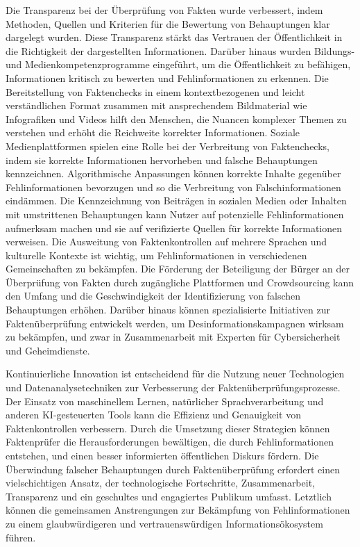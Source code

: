 \documentclass[a4paper,listof=totoc,bibliography=totoc]{scrartcl}
\begin{document}
Die Transparenz bei der Überprüfung von Fakten wurde verbessert, indem Methoden, Quellen und Kriterien für die Bewertung von Behauptungen klar dargelegt wurden. Diese 
Transparenz stärkt das Vertrauen der Öffentlichkeit in die Richtigkeit der dargestellten Informationen. Darüber hinaus wurden Bildungs- und Medienkompetenzprogramme eingeführt, 
um die Öffentlichkeit zu befähigen, Informationen kritisch zu bewerten und Fehlinformationen zu erkennen. Die Bereitstellung von Faktenchecks in einem kontextbezogenen 
und leicht verständlichen Format zusammen mit ansprechendem Bildmaterial wie Infografiken und Videos hilft den Menschen, die Nuancen komplexer Themen zu verstehen und 
erhöht die Reichweite korrekter Informationen. Soziale Medienplattformen spielen eine Rolle bei der Verbreitung von Faktenchecks, indem sie korrekte Informationen 
hervorheben und falsche Behauptungen kennzeichnen. Algorithmische Anpassungen können korrekte Inhalte gegenüber Fehlinformationen bevorzugen und so die Verbreitung von 
Falschinformationen eindämmen. Die Kennzeichnung von Beiträgen in sozialen Medien oder Inhalten mit umstrittenen Behauptungen kann Nutzer auf potenzielle Fehlinformationen 
aufmerksam machen und sie auf verifizierte Quellen für korrekte Informationen verweisen. Die Ausweitung von Faktenkontrollen auf mehrere Sprachen und kulturelle Kontexte 
ist wichtig, um Fehlinformationen in verschiedenen Gemeinschaften zu bekämpfen. Die Förderung der Beteiligung der Bürger an der Überprüfung von Fakten durch zugängliche 
Plattformen und Crowdsourcing kann den Umfang und die Geschwindigkeit der Identifizierung von falschen Behauptungen erhöhen. Darüber hinaus können spezialisierte Initiativen 
zur Faktenüberprüfung entwickelt werden, um Desinformationskampagnen wirksam zu bekämpfen, und zwar in Zusammenarbeit mit Experten für Cybersicherheit und Geheimdienste.\newline

Kontinuierliche Innovation ist entscheidend für die Nutzung neuer Technologien und Datenanalysetechniken zur Verbesserung der Faktenüberprüfungsprozesse. Der Einsatz von 
maschinellem Lernen, natürlicher Sprachverarbeitung und anderen KI-gesteuerten Tools kann die Effizienz und Genauigkeit von Faktenkontrollen verbessern. Durch die Umsetzung 
dieser Strategien können Faktenprüfer die Herausforderungen bewältigen, die durch Fehlinformationen entstehen, und einen besser informierten öffentlichen Diskurs fördern. Die 
Überwindung falscher Behauptungen durch Faktenüberprüfung erfordert einen vielschichtigen Ansatz, der technologische Fortschritte, Zusammenarbeit, Transparenz und ein geschultes 
und engagiertes Publikum umfasst. Letztlich können die gemeinsamen Anstrengungen zur Bekämpfung von Fehlinformationen zu einem glaubwürdigeren und vertrauenswürdigen Informationsökosystem 
führen.
\end{document}

